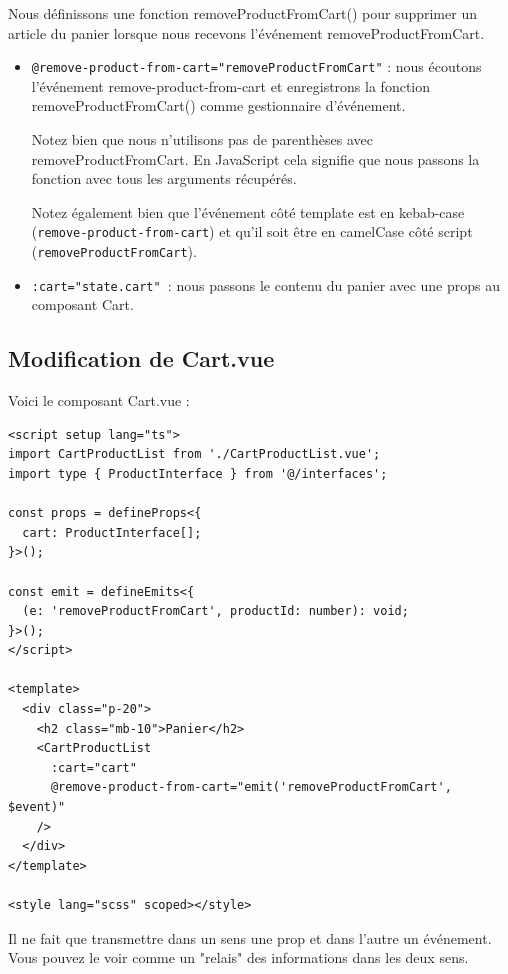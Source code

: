 Nous définissons une fonction {\color{monOrange}removeProductFromCart()} pour supprimer un article du panier lorsque nous recevons l'événement {\color{monOrange}removeProductFromCart}.
\begin{itemize}
\item {\tt @remove-product-from-cart="removeProductFromCart"} : nous écoutons l'événement {\color{monOrange}remove-product-from-cart} et enregistrons la fonction {\color{monOrange}removeProductFromCart()} comme gestionnaire d'événement.

Notez bien que nous n'utilisons pas de parenthèses avec {\color{monOrange}removeProductFromCart}. En JavaScript cela signifie que nous passons la fonction avec tous les arguments récupérés.

Notez également bien que l'événement côté {\color{monOrange}template} est en {\color{monOrange}kebab-case} ({\tt remove-product-from-cart}) et qu'il soit être en {\color{monOrange}camelCase} côté script ({\tt removeProductFromCart}).

\item {\tt :cart="state.cart" }: nous passons le contenu du panier avec une {\color{monOrange}props} au composant {\color{monOrange}Cart}.
\end{itemize}
\subsection{Modification de {\color{monOrange}Cart.vue}}
Voici le composant {\color{monOrange}Cart.vue} :
\begin{verbatim}
<script setup lang="ts">
import CartProductList from './CartProductList.vue';
import type { ProductInterface } from '@/interfaces';

const props = defineProps<{
  cart: ProductInterface[];
}>();

const emit = defineEmits<{
  (e: 'removeProductFromCart', productId: number): void;
}>();
</script>

<template>
  <div class="p-20">
    <h2 class="mb-10">Panier</h2>
    <CartProductList
      :cart="cart"
      @remove-product-from-cart="emit('removeProductFromCart', $event)"
    />
  </div>
</template>

<style lang="scss" scoped></style>
\end{verbatim}
Il ne fait que transmettre dans un sens une {\color{monOrange}prop} et dans l'autre un événement. Vous pouvez le voir comme un "relais" des informations dans les deux sens.
